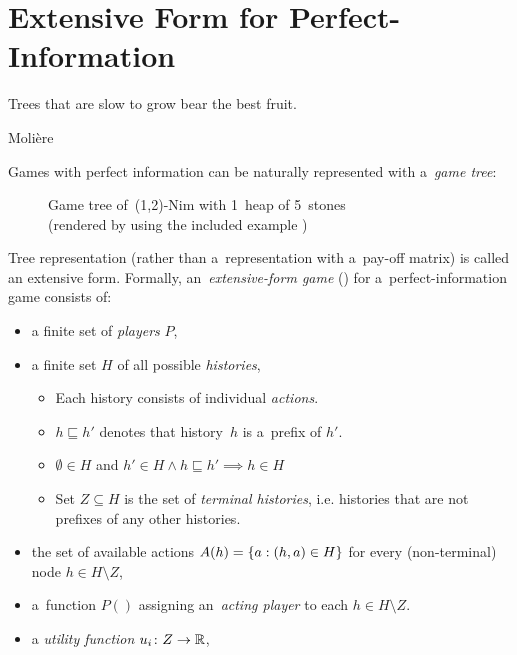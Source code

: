 \section{Extensive Form for Perfect-Information}
\label{sec:extensive-form-perf-info}
\epigraph{Trees that are slow to grow bear the best fruit.}
{Molière}
Games with perfect information can be naturally represented with a~\emph{game tree}:
\begin{figure}[H]
  \centering
  \scriptsize
  \def\svgwidth{.9\textwidth}
  
  \def\captionTitle{Game tree of~(1,2)-Nim with 1~heap of 5~stones}
  \caption[\captionTitle]{\captionTitle{}\\ (rendered by  using the included example )}
  \label{fig:game-tree-nim-5}
\end{figure}
\noindent
Tree representation (rather than a~representation with a~pay-off matrix) is called an extensive form.
Formally, an~\emph{extensive-form game} (\cite[p.~200]{Osborne1994course}) for a~perfect-information game consists of:
\begin{itemize}
  \item a finite set of \emph{players} $P$,

  \item a finite set $H$ of all possible \emph{histories},
    \begin{itemize}
      \item Each history consists of individual \emph{actions}.
      \item $h \sqsubseteq h'$ denotes that history~$h$ is a~prefix of $h'$.
      \item $\emptyset \in H$ and $h' \in H \land h \sqsubseteq h' \implies h \in H$
      \item Set $Z \subseteq H$ is the set of \emph{terminal histories}, i.e. histories that are not prefixes of any other histories.
    \end{itemize}

  \item the set of available actions $A(h) = \left\{ a: (h, a) \in H \right\}$ for every (non-terminal) node $h \in H \setminus Z$,

  \item a~function $P()$ assigning an~\emph{acting player} to each $h \in H \setminus Z$.

  \item a \emph{utility function} $u_i\colon Z \rightarrow \mathbb{R}$,
\end{itemize}

